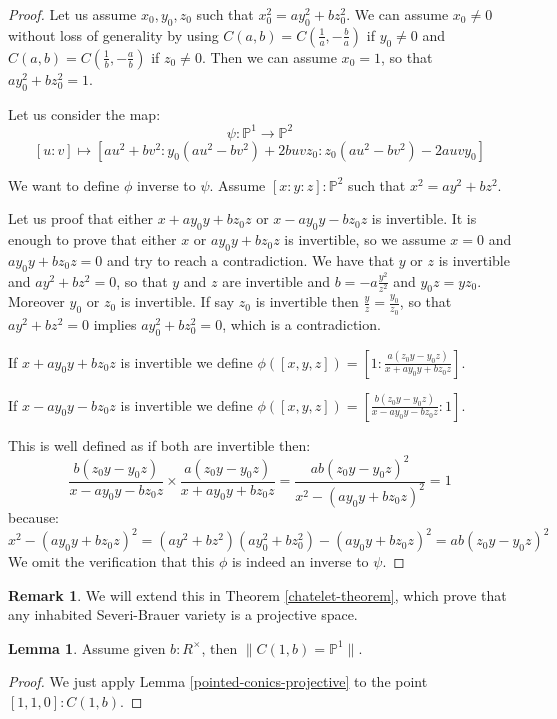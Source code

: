 \documentclass[10pt,a4paper]{article}
\theoremstyle{definition}
\newtheorem{lemma}[theorem]{Lemma}
\newtheorem{remark}[theorem]{Remark}
\newcommand{\propTrunc}[1]{\lVert #1 \rVert}
\newcommand{\bP}{\mathbb{P}}
\begin{document}
\begin{proof}
Let us assume $x_0,y_0,z_0$ such that $x_0^2 = ay_0^2+bz_0^2$. We can assume $x_0\not=0$ without loss of generality by using $C(a,b) = C(\frac{1}{a},-\frac{b}{a})$ if $y_0\not=0$ and $C(a,b) = C(\frac{1}{b},-\frac{a}{b})$ if $z_0\not=0$. Then we can assume $x_0=1$, so that $ay_0^2 + bz_0^2 = 1$.

 Let us consider the map:
\[\psi:\bP^1\to \bP^2\]
\[[u:v] \mapsto [au^2+bv^2: y_0(au^2-bv^2) + 2buvz_0 : z_0(au^2-bv^2) - 2auvy_0]\]

We want to define $\phi$ inverse to $\psi$. Assume $[x:y:z]:\bP^2$ such that $x^2=ay^2+bz^2$. 

Let us proof that either $x+ay_0y+bz_0z$ or $x-ay_0y-bz_0z$ is invertible. It is enough to prove that either $x$ or $ay_0y+bz_0z$ is invertible, so we assume $x=0$ and $ay_0y+bz_0z=0$ and try to reach a contradiction. We have that $y$ or $z$ is invertible and $ay^2+bz^2=0$, so that $y$ and $z$ are invertible and $b = -a\frac{y^2}{z^2}$ and $y_0z=yz_0$. Moreover $y_0$ or $z_0$ is invertible. If say $z_0$ is invertible then $\frac{y}{z} = \frac{y_0}{z_0}$, so that $ay^2+bz^2=0$ implies $ay_0^2+bz_0^2=0$, which is a contradiction. 

If $x + ay_0y + bz_0z$ is invertible we define $\phi([x,y,z]) = [1:\frac{a(z_0y-y_0z)}{x + ay_0y + bz_0z}]$.

If $x - ay_0y - bz_0z$ is invertible we define $\phi([x,y,z]) = [\frac{b(z_0y-y_0z)}{x - ay_0y - bz_0z}:1]$.

This is well defined as if both are invertible then:
\[\frac{b(z_0y-y_0z)}{x - ay_0y - bz_0z}\times\frac{a(z_0y-y_0z)}{x + ay_0y + bz_0z} = \frac{ab(z_0y-y_0z)^2}{x^2 - (ay_0y + bz_0z)^2} = 1\]
because:
\[x^2 - (ay_0y + bz_0z)^2 = (ay^2+bz^2)(ay_0^2+bz_0^2) - (ay_0y + bz_0z)^2 = ab(z_0y-y_0z)^2\]
We omit the verification that this $\phi$ is indeed an inverse to $\psi$.
\end{proof}

\begin{remark}
We will extend this in Theorem \ref{chatelet-theorem}, which prove that any inhabited Severi-Brauer variety is a projective space. 
\end{remark}

\begin{lemma}\label{conic-one-split}
Assume given $b:R^\times$, then $\propTrunc{C(1,b) = \bP^1}$.
\end{lemma}

\begin{proof}
We just apply Lemma \ref{pointed-conics-projective} to the point $[1,1,0]:C(1,b)$.
\end{proof}
\end{document}
